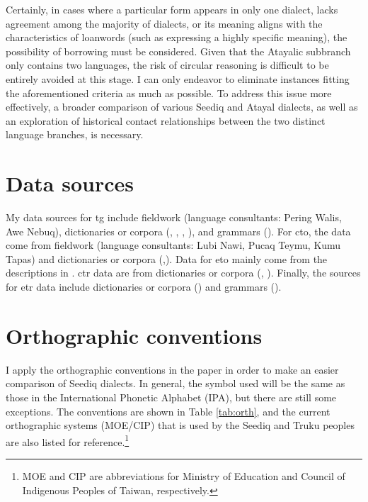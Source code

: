 Certainly, in cases where a particular form appears in only one dialect, lacks agreement among the majority of dialects, or its meaning aligns with the characteristics of loanwords (such as expressing a highly specific meaning), the possibility of borrowing must be considered. Given that the Atayalic subbranch only contains two languages, the risk of circular reasoning is difficult to be entirely avoided at this stage. I can only endeavor to eliminate instances fitting the aforementioned criteria as much as possible. To address this issue more effectively, a broader comparison of various Seediq and Atayal dialects, as well as an exploration of historical contact relationships between the two distinct language branches, is necessary.


\section{Data sources}

My data sources for \acl{tg} include fieldwork (language consultants: Pering Walis, Awe Nebuq), dictionaries or corpora (\cite{ILRDF1000words}, \cite{ILRDFEdict}, \cite{Seddatabase}, \cite{watandiro2009seddict}), and grammars (\cite{Sung2018Sedgrammar,ochiai2016phd}). For \acl{cto}, the data come from fieldwork (language consultants: Lubi Nawi, Pucaq Teymu, Kumu Tapas) and dictionaries or corpora (\cite{ILRDF1000words,Seddatabase},\cite{watandiro2009seddict}). Data for \acl{eto} mainly come from the descriptions in \textcite{lee2015tawsa}. \acl{ctr} data are from dictionaries or corpora (\cite{ILRDF1000words,Seddatabase}, \cite{watandiro2009seddict}). Finally, the sources for \acl{etr} data include dictionaries or corpora (\cite{ILRDF1000words,ILRDFEdict}) and grammars (\cite{Lee2018Trugrammar,tsukida2009}).


\section{Orthographic conventions}

I apply the orthographic conventions in the paper in order to make an easier comparison of Seediq dialects. In general, the symbol used will be the same as those in the International Phonetic Alphabet (IPA), but there are still some exceptions. The conventions are shown in Table \ref{tab:orth}, and the current orthographic systems (MOE/CIP) that is used by the Seediq and Truku peoples are also listed for reference.\footnote{MOE and CIP are abbreviations for Ministry of Education and Council of Indigenous Peoples of Taiwan, respectively.} 

